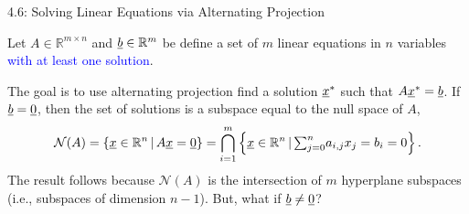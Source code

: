 \documentclass[10pt,english,aspectratio=169]{beamer}
\begin{document}
\begin{frame}{4.6: Solving Linear Equations via Alternating Projection}

\vspace{-10mm}

Let $A\in\mathbb{R}^{m\times n}$ and $\underline b\in\mathbb{R}^{m}$ be define a set of $m$ linear equations in $n$ variables \textcolor{blue}{with at least one solution}.

\vspace{3mm}

The goal is to use alternating projection find a solution $\underline x^{*}$ such that $A\underline x^{*}=\underline b$. If $\underline b=\underline 0$, then the set of solutions is a subspace equal to the null space of $A$,
\[
\mathcal{N}(A)=\left\{ \underline x\in\mathbb{R}^{n}\,|\,A\underline x=\underline 0\right\} =\bigcap_{i=1}^{m}\left\{ \underline x\in\mathbb{R}^{n}\,|\,{\textstyle \sum_{j=0}^{n}}a_{i,j}x_{j}=b_i = 0\right\} .
\]
The result follows because $\mathcal{N}(A)$ is the intersection of $m$ hyperplane subspaces (i.e., subspaces of dimension $n-1$). But, what if $\underline b\neq\underline 0$?


\end{frame}
\end{document}
